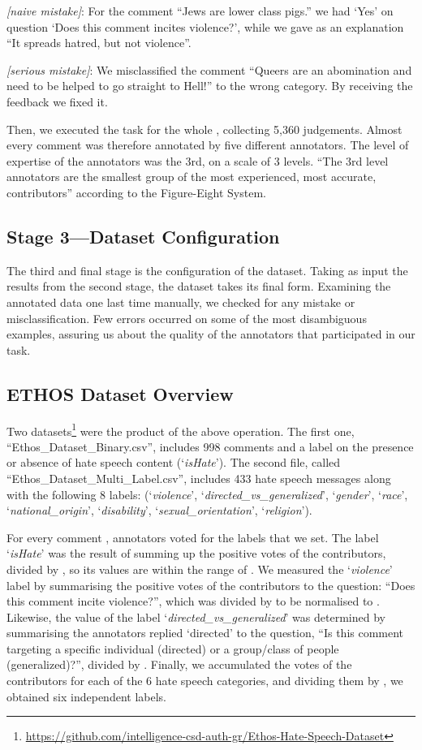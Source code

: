 \documentclass[sigconf]{acmart}
\begin{document}
\textit{[naive mistake]}: For the comment ``Jews are lower class pigs.'' we had `Yes' on question `Does this comment incites violence?', while we gave as an explanation ``It spreads hatred, but not violence''.

\textit{[serious mistake]}: We misclassified the comment ``Queers are an abomination and need to be helped to go straight to Hell!'' to the wrong category. By receiving the feedback we fixed it.

Then, we executed the task for the whole , collecting 5,360 judgements. Almost every comment was therefore annotated by five different annotators. The level of expertise of the annotators was the 3rd, on a scale of 3 levels. ``The 3rd level annotators are the smallest group of the most experienced, most accurate, contributors'' according to the Figure-Eight System.

\subsection{Stage 3---Dataset Configuration}
The third and final stage is the configuration of the dataset. Taking as input the results from the second stage, the dataset takes its final form. Examining the annotated data one last time manually, we checked for any mistake or misclassification. Few errors occurred on some of the most disambiguous examples, assuring us about the quality of the annotators that participated in our task. 


\subsection{ETHOS Dataset Overview}

Two datasets\footnote{\url{https://github.com/intelligence-csd-auth-gr/Ethos-Hate-Speech-Dataset}} were the product of the above operation. The first one, ``Ethos\_Dataset\_Binary.csv'', includes 998 comments and a label on the presence or absence of hate speech content (`\textit{isHate}'). The second file, called ``Ethos\_Dataset\_Multi\_Label.csv'', includes 433 hate speech messages along with the following 8 labels: (`\textit{violence}', `\textit{directed\_vs\_generalized}', `\textit{gender}', `\textit{race}', `\textit{national\_origin}', `\textit{disability}', `\textit{sexual\_orientation}', `\textit{religion}'). 

For every comment ,  annotators voted for the labels that we set. The label `\textit{isHate}' was the result of summing up the positive votes  of the contributors, divided by , so its values are within the range of . We measured the `\textit{violence}' label by summarising the positive votes of the contributors  to the question: ``Does this comment incite violence?'', which was divided by  to be normalised to . Likewise, the value of the label `\textit{directed\_vs\_generalized}' was determined by summarising the annotators replied `directed'  to the question, ``Is this comment targeting a specific individual (directed) or a group/class of people (generalized)?'', divided by . Finally, we accumulated the votes of the  contributors for each of the 6 hate speech categories, and dividing them by , we obtained six independent labels.
\end{document}
